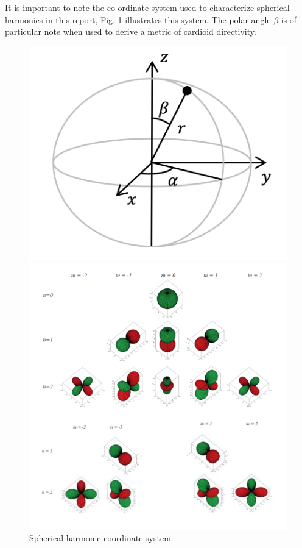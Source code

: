 \documentclass{report}
\begin{document}
        It is important to note the co-ordinate system used to characterize spherical harmonics in this report, Fig. \ref{sphericalCoords} illustrates this system.
        The polar angle $\beta$ is of particular note when used to derive a metric of cardioid directivity.
    
        \begin{figure}[H]
            \centering
            \begin{minipage}{.4\textwidth}
                \centering
                \includegraphics[width=\linewidth]{figs/sphericalCoords.png}
                \caption{Spherical harmonic coordinate system \cite{hargreaves2020spherical}}
                \label{sphericalCoords}
            \end{minipage}
            \begin{minipage}{.59\textwidth}
                \centering
                \includegraphics[width=\linewidth]{figs/klippelSphericalHarms.png}

\end{minipage}
\end{figure}
\end{document}
